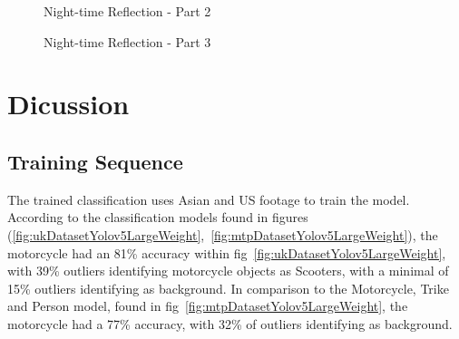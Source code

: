 \documentclass[12pt]{report} %
\begin{document}
		\begin{figure}[hb]
			\begin{floatrow}
				{
					\caption{Night-time Reflection - Part 2}
					\label{fig:ntReflectionP2}
				}
			
				{
					\caption{Night-time Reflection - Part 3}
					\label{fig:ntReflectionP3}
				}
			\end{floatrow}
		\end{figure}

\chapter{Dicussion}
\label{chap:discussion}
	\section{Training Sequence}
		The trained classification uses Asian and US footage to train the model. According to the classification models found in figures (\ref{fig:ukDatasetYolov5LargeWeight},~\ref{fig:mtpDatasetYolov5LargeWeight}), the motorcycle had an 81\% accuracy within fig~\ref{fig:ukDatasetYolov5LargeWeight}, with 39\% outliers identifying motorcycle objects as Scooters, with a minimal of 15\% outliers identifying as background. In comparison to the Motorcycle, Trike and Person model, found in fig~\ref{fig:mtpDatasetYolov5LargeWeight}, the motorcycle had a 77\% accuracy, with 32\% of outliers identifying as background.
\end{document}
